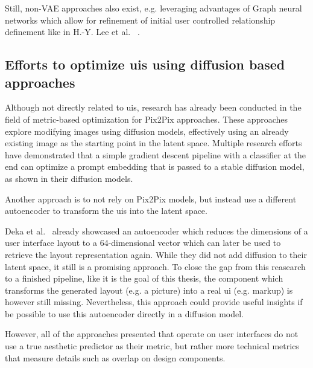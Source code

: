 \documentclass[10pt,a4paper]{scrartcl} %
\begin{document}
Still, non-VAE approaches also exist, e.g. leveraging advantages of Graph neural networks which allow for refinement of initial user controlled relationship definement like in  H.-Y. Lee et al. ~\cite{lee2020neural}.
 
\subsection{Efforts to optimize \ac{uis} using diffusion based approaches}
Although not directly related to \ac{uis}, research has already been conducted in the field of metric-based optimization for Pix2Pix approaches. These approaches explore modifying images using diffusion models, effectively using an already existing image as the starting point in the latent space.
Multiple research efforts have demonstrated that a simple gradient descent pipeline with a classifier at the end can optimize a prompt embedding that is passed to a stable diffusion model, as shown in their diffusion models. \cite{deckers2023manipulating,zhan2024capabilityaware}

Another approach is to not rely on Pix2Pix models, but instead use a different autoencoder to transform the \acp{ui} into the latent space.

Deka et al.~\cite{10.1145/3126594.3126651} already showcased an autoencoder which reduces the dimensions of a user interface layout to a 64-dimensional vector which can later be used to retrieve the layout representation again. While they did not add diffusion to their latent space, it still is a promising approach. To close the gap from this reasearch to a finished pipeline, like it is the goal of this thesis, the component which transforms the generated layout (e.g. a picture) into a real \ac{ui} (e.g. markup) is however still missing.
 Nevertheless, this approach could provide useful insights if be possible to use this autoencoder directly in a diffusion model.

However, all of the approaches presented that operate on user interfaces do not use a true aesthetic predictor as their metric, but rather more technical metrics that measure details such as overlap on design components.
\end{document}
